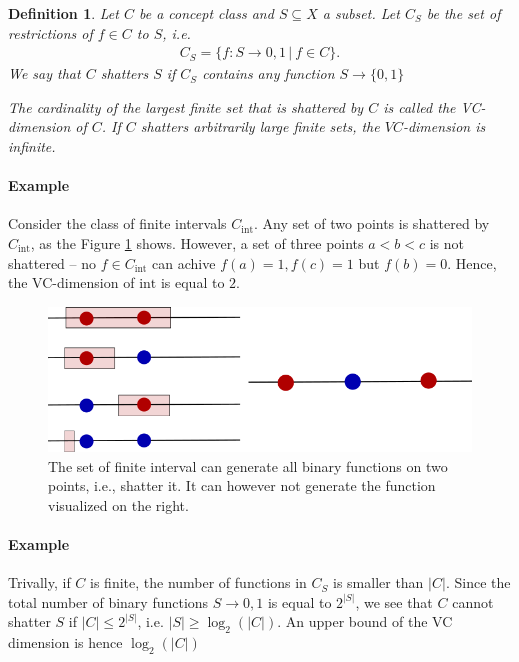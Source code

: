 \documentclass{article}
\newcommand{\sse}{\subseteq}
\newtheorem{defi}{Definition}
\newcommand{\abs}[1]{\vert #1 \vert}
\begin{document}
\begin{defi}
    Let $C$ be a concept class and $S\sse X$ a subset. Let $C_S$ be the set of restrictions of $f\in C$ to $S$, i.e.
    \begin{align*}
        C_S = \{f:S \to {0,1} \, \vert \ f\in C\}.
    \end{align*}
    We say that $C$ \emph{shatters} $S$ if $C_S$ contains any function $S\to \{0,1\}$

    The cardinality of the largest finite set that is shattered by $C$ is called the \emph{VC-dimension} of $C$. If $C$ shatters arbitrarily large finite sets, the $VC$-dimension is infinite.
\end{defi}

\paragraph{Example} Consider the class of finite intervals $C_{\mathrm{int}}$. Any set of two points is shattered by $C_{\mathrm{int}}$, as the Figure \ref{fig:vcinterval} shows. However, a set of three points $a<b<c$ is not shattered -- no $f\in C_{\mathrm{int}}$ can achive $f(a)=1, f(c)=1$ but $f(b)=0$. Hence, the VC-dimension of ${\mathrm{int}}$ is equal to $2$.

\begin{figure}
    \centering
    \includegraphics[width=0.6\linewidth]{graphics/VC_INTERVAL.png}
    \caption{The set of finite interval can generate all binary functions on two points, i.e., shatter it. It can however not generate the function visualized on the right.}
    \label{fig:vcinterval}
\end{figure}

\paragraph{Example} Trivally, if $C$ is finite, the number of functions in $C_S$ is smaller than $\abs{C}$. Since the total number of binary functions $S\to {0,1}$ is equal to $2^{\abs{S}}$, we see that $C$ cannot shatter $S$ if $\abs{C}\leq 2^{\abs{S}}$, i.e. $\abs{S}\geq \log_2(\abs{C})$. An upper bound of the VC dimension is hence $\log_2(\abs{C})$
\end{document}
